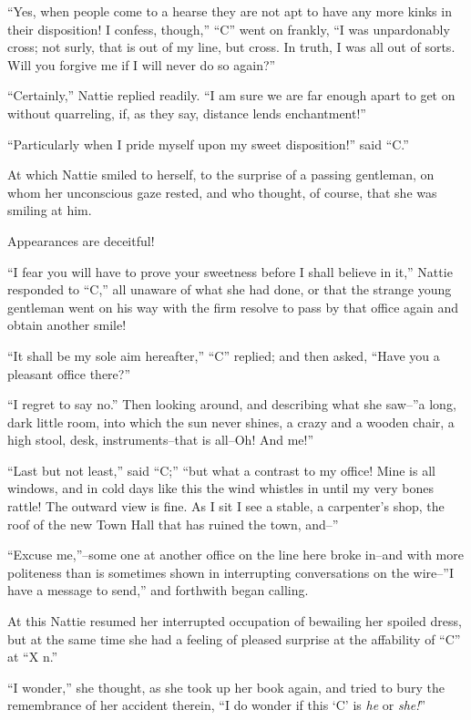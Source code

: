 ``Yes, when people come to a hearse they are not apt to have any more
kinks in their disposition! I confess, though,'' ``C'' went on frankly, ``I
was unpardonably cross; not surly, that is out of my line, but cross. In
truth, I was all out of sorts. Will you forgive me if I will never do so
again?''

``Certainly,'' Nattie replied readily. ``I am sure we are far enough apart
to get on without quarreling, if, as they say, distance lends
enchantment!''

``Particularly when I pride myself upon my sweet disposition!'' said ``C.''

At which Nattie smiled to herself, to the surprise of a passing
gentleman, on whom her unconscious gaze rested, and who thought, of
course, that she was smiling at him.

Appearances are deceitful!

``I fear you will have to prove your sweetness before I shall believe in
it,'' Nattie responded to ``C,'' all unaware of what she had done, or that
the strange young gentleman went on his way with the firm resolve to
pass by that office again and obtain another smile!

``It shall be my sole aim hereafter,'' ``C'' replied; and then asked, ``Have
you a pleasant office there?''

``I regret to say no.'' Then looking around, and describing what she
saw--''a long, dark little room, into which the sun never shines, a crazy
and a wooden chair, a high stool, desk, instruments--that is all--Oh!
And me!''

``Last but not least,'' said ``C;'' ``but what a contrast to my office! Mine
is all windows, and in cold days like this the wind whistles in until my
very bones rattle! The outward view is fine. As I sit I see a stable, a
carpenter's shop, the roof of the new Town Hall that has ruined the
town, and--''

``Excuse me,''--some one at another office on the line here broke in--and
with more politeness than is sometimes shown in interrupting
conversations on the wire--''I have a message to send,'' and forthwith
began calling.

At this Nattie resumed her interrupted occupation of bewailing her
spoiled dress, but at the same time she had a feeling of pleased
surprise at the affability of ``C'' at ``X n.''

``I wonder,'' she thought, as she took up her book again, and tried to
bury the remembrance of her accident therein, ``I do wonder if this `C'
is \emph{he} or \emph{she!}''

